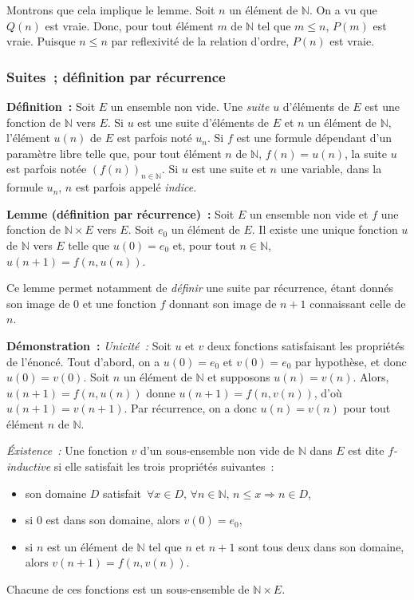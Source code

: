     Montrons que cela implique le lemme. 
    Soit $n$ un élément de $\mathbb{N}$. 
    On a vu que $Q(n)$ est vraie. 
    Donc, pour tout élément $m$ de $\mathbb{N}$ tel que $m \leq n$, $P(m)$ est vraie. 
    Puisque $n \leq n$ par reflexivité de la relation d'ordre, $P(n)$ est vraie.

   \done 

\subsubsection{Suites ; définition par récurrence}
\label{subsub:suites}

\noindent\textbf{Définition :} Soit $E$ un ensemble non vide. 
    Une \textit{suite} $u$ d'éléments de $E$ est une fonction de $\mathbb{N}$ vers $E$. 
    Si $u$ est une suite d'éléments de $E$ et $n$ un élément de $\mathbb{N}$, l'élément $u(n)$ de $E$ est parfois noté $u_n$. 
    Si $f$ est une formule dépendant d'un paramètre libre telle que, pour tout élément $n$ de $\mathbb{N}$, $f(n) = u(n)$, la suite $u$ est parfois notée $\left( f(n) \right)_{n \in \mathbb{N}}$.
    Si $u$ est une suite et $n$ une variable, dans la formule $u_n$, $n$ est parfois appelé \textit{indice}.

\medskip

\noindent\textbf{Lemme (définition par récurrence) :} Soit $E$ un ensemble non vide et $f$ une fonction de $\mathbb{N} \times E$ vers $E$.
    Soit $e_0$ un élément de $E$. 
    Il existe une unique fonction $u$ de $\mathbb{N}$ vers $E$ telle que $u(0) = e_0$ et, pour tout $n \in \mathbb{N}$, $u(n+1) = f(n, u(n))$.

\medskip

\noindent Ce lemme permet notamment de \textit{définir} une suite par récurrence, étant donnés son image de $0$ et une fonction $f$ donnant son image de $n+1$ connaissant celle de $n$.

\medskip

\noindent\textbf{Démonstration :}
\textit{Unicité :} Soit $u$ et $v$ deux fonctions satisfaisant les propriétés de l'énoncé. 
       Tout d'abord, on a $u(0) = e_0$ et $v(0) = e_0$ par hypothèse, et donc $u(0) = v(0)$.
       Soit $n$ un élément de $\mathbb{N}$ et supposons $u(n) = v(n)$. Alors, $u(n+1) = f(n, u(n))$ donne $u(n+1) = f(n, v(n))$, d'où $u(n+1) = v(n+1)$. 
       Par récurrence, on a donc $u(n) = v(n)$ pour tout élément $n$ de $\mathbb{N}$.

\textit{Éxistence :} Une fonction $v$ d'un sous-ensemble non vide de $\mathbb{N}$ dans $E$ est dite \textit{$f$-inductive} si elle satisfait les trois propriétés suivantes : 
    \begin{itemize}[nosep]
        \item son domaine $D$ satisfait $\forall x \in D, \, \forall n \in \mathbb{N}, \, n \leq x \Rightarrow n \in D$, 
        \item si $0$ est dans son domaine, alors $v(0) = e_0$, 
        \item si $n$ est un élément de $\mathbb{N}$ tel que $n$ et $n+1$ sont tous deux dans son domaine, alors $v(n+1) = f(n, v(n))$. 
    \end{itemize}
   Chacune de ces fonctions est un sous-ensemble de $\mathbb{N} \times E$. 
   
